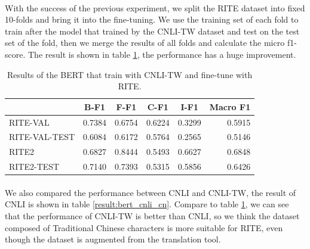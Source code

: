 \documentclass[12pt]{article}
\begin{document}
\begin{CJK*}{UTF8}{bkai}
\begin{spacing}{1.77}
\paragraph{}
With the success of the previous experiment, we split the RITE dataset into fixed 10-folds and bring it into the fine-tuning. We use the training set of each fold to train after the model that trained by the CNLI-TW dataset and test on the test set of the fold, then we merge the results of all folds and calculate the micro f1-score. The result is shown in table \ref{result:bert_cnli_transfer}, the performance has a huge improvement.

\begin{table}[ht!]
  \centering
  \begin{tabular}{|l|r|r|r|r|r|}
  \hline
   & \multicolumn{1}{c|}{B-F1} & \multicolumn{1}{c|}{F-F1} & \multicolumn{1}{c|}{C-F1} & \multicolumn{1}{c|}{I-F1} & \multicolumn{1}{c|}{Macro F1} \\ \hline
  RITE-VAL & 0.7384 & 0.6754 & 0.6224 & 0.3299 & 0.5915 \\ \hline
  RITE-VAL-TEST & 0.6084 & 0.6172 & 0.5764 & 0.2565 & 0.5146 \\ \hline
  RITE2 & 0.6827 & 0.8444 & 0.5493 & 0.6627 & 0.6848 \\ \hline
  RITE2-TEST & 0.7140 & 0.7393 & 0.5315 & 0.5856 & 0.6426 \\ \hline
  \end{tabular}
  \caption{Results of the BERT that train with CNLI-TW and fine-tune with RITE.}
  \label{result:bert_cnli_transfer}
\end{table}

\paragraph{}
We also compared the performance between CNLI and CNLI-TW, the result of CNLI is shown in table \ref{result:bert_cnli_cn}. Compare to table \ref{result:bert_cnli_transfer}, we can see that the performance of CNLI-TW is better than CNLI, so we think the dataset composed of Traditional Chinese characters is more suitable for RITE, even though the dataset is augmented from the translation tool.


\end{spacing}
\end{CJK*}
\end{document}
